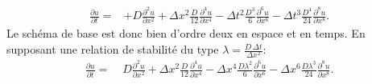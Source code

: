 \begin{align}
    \frac{\partial u}{\partial t}  =&+ D \frac{\partial^{2}u}{\partial x^{2}} 
    + \Delta x^{2} \frac{D}{12}             \frac{\partial^{4}u}{\partial x^{4}} 
    -  \Delta t^{2} \frac{D^{3}}{6}          \frac{\partial^{6}u}{\partial x^{6}} 
    -  \Delta t^{3} \frac{D^{4}}{24}        \frac{\partial^{8}u}{\partial x^{8}}.
\end{align}
Le schéma de base est donc bien d'ordre deux en espace et en temps.
En supposant une relation de stabilité du type $\lambda = \frac{D\, \Delta t }{\Delta x^2}$:
\begin{align}
    \frac{\partial u}{\partial t}  =&\; D \frac{\partial^{2}u}{\partial x^{2}} 
    + \Delta x^{2} \frac{D}{12}             \frac{\partial^{4}u}{\partial x^{4}}
    - \Delta x^{4} \frac{D \lambda^2}{6}     \frac{\partial^{6}u}{\partial x^{6}}
    - \Delta x^{6} \frac{D \lambda^3}{24}    \frac{\partial^{8}u}{\partial x^{8}}.
\end{align}
